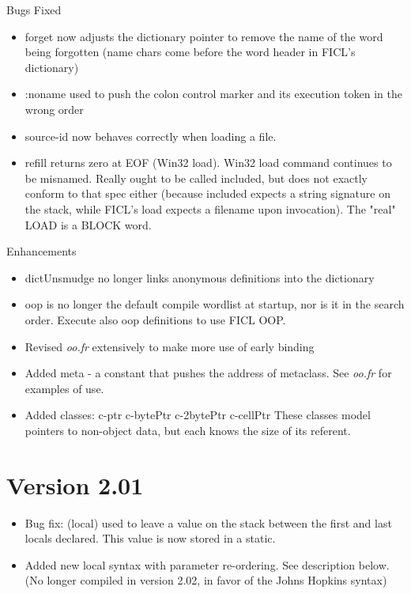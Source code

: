 Bugs Fixed
\begin{itemize}[noitemsep]
	\item forget now adjusts the dictionary pointer to remove the
	name of the word being forgotten (name chars come before the
	word header in FICL's dictionary)

	\item :noname used to push the colon control marker and its
	execution token in the wrong order

	\item source-id now behaves correctly when loading a file.

	\item refill returns zero at EOF (Win32 load). Win32 load
	command continues to be misnamed. Really ought to be called
	included, but does not exactly conform to that spec either
	(because included expects a string signature on the stack,
	while FICL's load expects a filename upon invocation). The
	"real" LOAD is a BLOCK word.
\end{itemize}

Enhancements
\begin{itemize}[noitemsep]
	\item dictUnsmudge no longer links anonymous definitions into
	the dictionary

	\item oop is no longer the default compile wordlist at startup,
	nor is it in the search order. Execute also oop definitions to
	use FICL OOP.

	\item Revised \textit{oo.fr} extensively to make more use of
	early binding

	\item Added meta - a constant that pushes the address of
	metaclass. See \textit{oo.fr} for examples of use.

	\item Added classes: c-ptr  c-bytePtr  c-2bytePtr  c-cellPtr
	These classes model pointers to non-object data, but each knows
	the size of its referent.
\end{itemize}


\section*{Version 2.01}
\begin{itemize}[noitemsep]
	\item Bug fix: (local) used to leave a value on the stack
	between the first and last locals declared. This value is now
	stored in a static.

	\item Added new local syntax with parameter re-ordering. See
	description below. (No longer compiled in version 2.02, in favor
	of the Johns Hopkins syntax)
\end{itemize}


